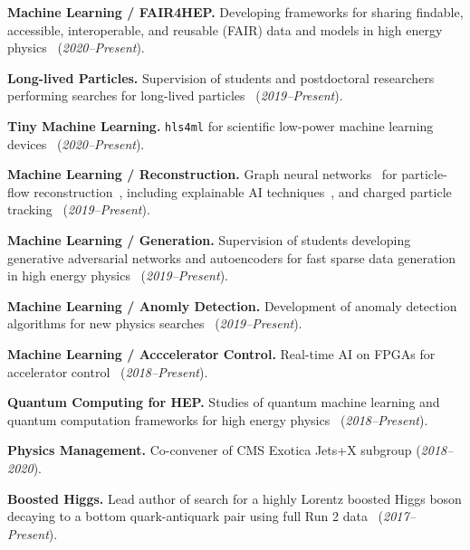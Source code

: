 \documentclass[11pt]{res}
\begin{document}
\begin{resume}
  \textbf{Machine Learning / FAIR4HEP.} Developing frameworks for sharing findable, accessible, interoperable, and reusable (FAIR) data and models in high energy physics~\cite{Chen:2021euv} (\textit{2020--Present}).

  \textbf{Long-lived Particles.} Supervision of students and postdoctoral researchers performing searches for long-lived particles~\cite{CMS:2021yhb,CMS:2021juv} (\textit{2019--Present}).

  \textbf{Tiny Machine Learning.} \texttt{hls4ml} for scientific low-power machine learning devices~\cite{Banbury:2021mlperf,DiGuglielmo:2021ide,Hawks:2021ruw,Fahim:2021cic} (\textit{2020--Present}).

  \textbf{Machine Learning / Reconstruction.} Graph neural networks~\cite{Duarte:2020ngm} for particle-flow reconstruction~\cite{Pata:2022wam,CMS-DP-2021-030,Pata:2021oez}, including explainable AI techniques~\cite{Mokhtar:2021bkf}, and charged particle tracking~\cite{Elabd:2021lgo,Dezoort:2021kfk,Heintz:2020soy} (\textit{2019--Present}).

  \textbf{Machine Learning / Generation.} Supervision of students developing generative adversarial networks and autoencoders for fast sparse data generation in high energy physics~\cite{Touranakou:2022qrp,Kansal:2021cqp,Orzari:2021suh,Kansal:2020svm} (\textit{2019--Present}).

  \textbf{Machine Learning / Anomly Detection.} Development of anomaly detection algorithms for new physics searches~\cite{Aarrestad:2021oeb,Jawahar:2021vyu,Tsan:2021brw,Govorkova:2021utb,Kasieczka:2021xcg,Wozniak:2020} (\textit{2019--Present}).

  \textbf{Machine Learning / Acccelerator Control.} Real-time AI on FPGAs for accelerator control~\cite{John:2020sak} (\textit{2018--Present}).

  \textbf{Quantum Computing for HEP.} Studies of quantum machine learning and quantum computation frameworks for high energy physics~\cite{Zlokapa:2019tkn} (\textit{2018--Present}).

  \textbf{Physics Management.} Co-convener of CMS Exotica Jets+X subgroup (\textit{2018--2020}).

  \textbf{Boosted Higgs.} Lead author of search for a highly Lorentz boosted Higgs boson
  decaying to a bottom quark-antiquark pair using full Run 2 data~\cite{Sirunyan:2020hwz} (\textit{2017--Present}).


\end{resume}
\end{document}

